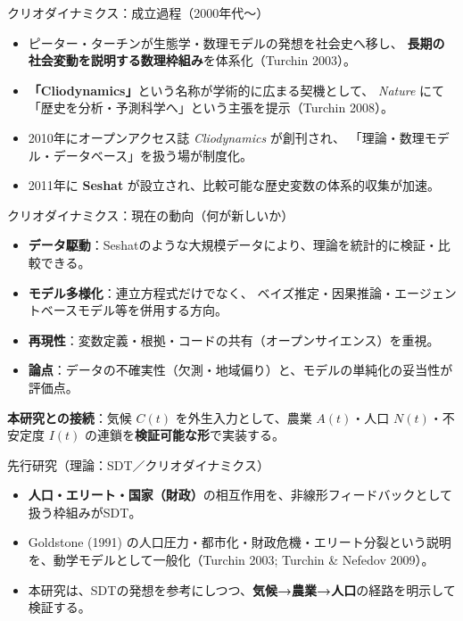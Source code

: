 \documentclass[aspectratio=169,11pt]{beamer}
\begin{document}
\begin{frame}{クリオダイナミクス：成立過程（2000年代〜）}
  \begin{itemize}
    \item ピーター・ターチンが生態学・数理モデルの発想を社会史へ移し、
      \textbf{長期の社会変動を説明する数理枠組み}を体系化（Turchin 2003）。
    \item \textbf{「Cliodynamics」}という名称が学術的に広まる契機として、
      \emph{Nature} にて「歴史を分析・予測科学へ」という主張を提示（Turchin 2008）。
    \item 2010年にオープンアクセス誌 \emph{Cliodynamics} が創刊され、
      「理論・数理モデル・データベース」を扱う場が制度化。
    \item 2011年に \textbf{Seshat} が設立され、比較可能な歴史変数の体系的収集が加速。
  \end{itemize}
\end{frame}

\begin{frame}{クリオダイナミクス：現在の動向（何が新しいか）}
  \begin{itemize}
    \item \textbf{データ駆動}：Seshatのような大規模データにより、理論を統計的に検証・比較できる。
    \item \textbf{モデル多様化}：連立方程式だけでなく、
      ベイズ推定・因果推論・エージェントベースモデル等を併用する方向。
    \item \textbf{再現性}：変数定義・根拠・コードの共有（オープンサイエンス）を重視。
    \item \textbf{論点}：データの不確実性（欠測・地域偏り）と、モデルの単純化の妥当性が評価点。
  \end{itemize}

  \vspace{0.4em}
  \textbf{本研究との接続}：気候 $C(t)$ を外生入力として、農業 $A(t)$・人口 $N(t)$・不安定度 $I(t)$ の連鎖を\textbf{検証可能な形}で実装する。
\end{frame}

\begin{frame}{先行研究（理論：SDT／クリオダイナミクス）}
  \begin{itemize}
    \item \textbf{人口・エリート・国家（財政）}の相互作用を、非線形フィードバックとして扱う枠組みがSDT。
    \item Goldstone (1991) の人口圧力・都市化・財政危機・エリート分裂という説明を、動学モデルとして一般化（Turchin 2003; Turchin \& Nefedov 2009）。
    \item 本研究は、SDTの発想を参考にしつつ、\textbf{気候→農業→人口}の経路を明示して検証する。
  \end{itemize}
\end{frame}
\end{document}
